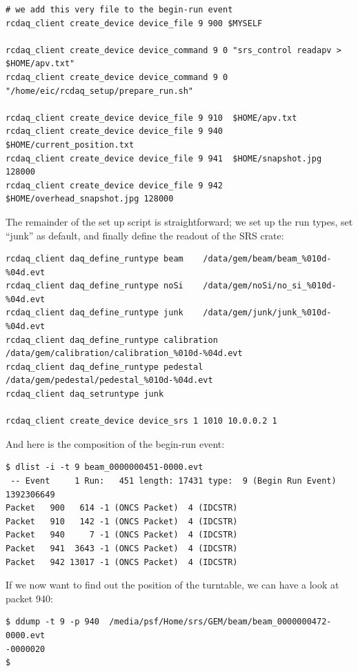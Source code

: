 \documentclass{article}[11pt]
\begin{document}
\begin{verbatim} 
# we add this very file to the begin-run event
rcdaq_client create_device device_file 9 900 $MYSELF

rcdaq_client create_device device_command 9 0 "srs_control readapv > $HOME/apv.txt"
rcdaq_client create_device device_command 9 0 "/home/eic/rcdaq_setup/prepare_run.sh"

rcdaq_client create_device device_file 9 910  $HOME/apv.txt
rcdaq_client create_device device_file 9 940  $HOME/current_position.txt
rcdaq_client create_device device_file 9 941  $HOME/snapshot.jpg 128000
rcdaq_client create_device device_file 9 942  $HOME/overhead_snapshot.jpg 128000
\end{verbatim} 

The remainder of the set up script is straightforward; we set up the run types, 
set ``junk'' as default, and finally define the readout of the SRS crate:

\begin{verbatim} 
rcdaq_client daq_define_runtype beam    /data/gem/beam/beam_%010d-%04d.evt
rcdaq_client daq_define_runtype noSi    /data/gem/noSi/no_si_%010d-%04d.evt
rcdaq_client daq_define_runtype junk    /data/gem/junk/junk_%010d-%04d.evt
rcdaq_client daq_define_runtype calibration /data/gem/calibration/calibration_%010d-%04d.evt
rcdaq_client daq_define_runtype pedestal /data/gem/pedestal/pedestal_%010d-%04d.evt
rcdaq_client daq_setruntype junk

rcdaq_client create_device device_srs 1 1010 10.0.0.2 1
\end{verbatim} 
 
And here is the composition of the begin-run event:

\begin{verbatim} 
$ dlist -i -t 9 beam_0000000451-0000.evt
 -- Event     1 Run:   451 length: 17431 type:  9 (Begin Run Event)  1392306649
Packet   900   614 -1 (ONCS Packet)  4 (IDCSTR)
Packet   910   142 -1 (ONCS Packet)  4 (IDCSTR)
Packet   940     7 -1 (ONCS Packet)  4 (IDCSTR)
Packet   941  3643 -1 (ONCS Packet)  4 (IDCSTR)
Packet   942 13017 -1 (ONCS Packet)  4 (IDCSTR)
\end{verbatim} 

If we now want to find out the position of the turntable, we can have  a
look at packet 940:

\begin{verbatim} 
$ ddump -t 9 -p 940  /media/psf/Home/srs/GEM/beam/beam_0000000472-0000.evt
-0000020
$
\end{verbatim} 
\end{document}
